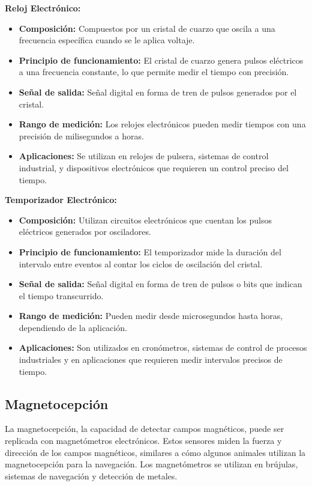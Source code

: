 \documentclass[conference]{IEEEtran}
\begin{document}
\textbf{Reloj Electrónico:}
\begin{itemize}
    \item \textbf{Composición:} Compuestos por un cristal de cuarzo que oscila a una frecuencia específica cuando se le aplica voltaje.
    \item \textbf{Principio de funcionamiento:} El cristal de cuarzo genera pulsos eléctricos a una frecuencia constante, lo que permite medir el tiempo con precisión.
    \item \textbf{Señal de salida:} Señal digital en forma de tren de pulsos generados por el cristal.
    \item \textbf{Rango de medición:} Los relojes electrónicos pueden medir tiempos con una precisión de milisegundos a horas.
    \item \textbf{Aplicaciones:} Se utilizan en relojes de pulsera, sistemas de control industrial, y dispositivos electrónicos que requieren un control preciso del tiempo.
\end{itemize}
\textbf{Temporizador Electrónico:}
\begin{itemize}
    \item \textbf{Composición:} Utilizan circuitos electrónicos que cuentan los pulsos eléctricos generados por osciladores.
    \item \textbf{Principio de funcionamiento:} El temporizador mide la duración del intervalo entre eventos al contar los ciclos de oscilación del cristal.
    \item \textbf{Señal de salida:} Señal digital en forma de tren de pulsos o bits que indican el tiempo transcurrido.
    \item \textbf{Rango de medición:} Pueden medir desde microsegundos hasta horas, dependiendo de la aplicación.
    \item \textbf{Aplicaciones:} Son utilizados en cronómetros, sistemas de control de procesos industriales y en aplicaciones que requieren medir intervalos precisos de tiempo.
\end{itemize}

\subsection{Magnetocepción}

La magnetocepción, la capacidad de detectar campos magnéticos, puede ser replicada con magnetómetros electrónicos. Estos sensores miden la fuerza y dirección de los campos magnéticos, similares a cómo algunos animales utilizan la magnetocepción para la navegación. Los magnetómetros se utilizan en brújulas, sistemas de navegación y detección de metales.\\
\end{document}
